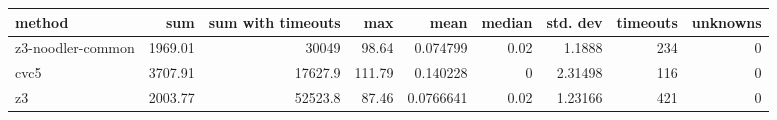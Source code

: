 \begin{tabular}{lrrrrrrrr}
\hline
 method            &     sum &   sum with timeouts &    max &      mean &   median &   std. dev &   timeouts &   unknowns \\
\hline
 z3-noodler-common & 1969.01 &             30049   &  98.64 & 0.074799  &     0.02 &    1.1888  &        234 &          0 \\
 cvc5              & 3707.91 &             17627.9 & 111.79 & 0.140228  &     0    &    2.31498 &        116 &          0 \\
 z3                & 2003.77 &             52523.8 &  87.46 & 0.0766641 &     0.02 &    1.23166 &        421 &          0 \\
\hline
\end{tabular}
